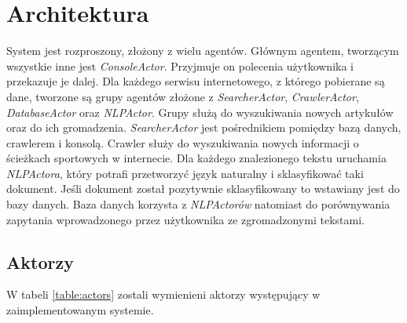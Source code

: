 \documentclass[titlepage]{article}
\begin{document}
\section{Architektura}
System jest rozproszony, złożony z wielu agentów. Głównym agentem, tworzącym wszystkie inne jest \textit{ConsoleActor}. Przyjmuje on polecenia użytkownika i przekazuje je dalej. Dla każdego serwisu internetowego, z którego pobierane są dane, tworzone są grupy agentów złożone z \textit{SearcherActor}, \textit{CrawlerActor}, \textit{DatabaseActor} oraz \textit{NLPActor}. Grupy służą do wyszukiwania nowych artykułów oraz do ich gromadzenia. \textit{SearcherActor} jest pośrednikiem pomiędzy bazą danych, crawlerem i konsolą. Crawler służy do wyszukiwania nowych informacji o ścieżkach sportowych w internecie. Dla każdego znalezionego tekstu uruchamia \textit{NLPActora}, który potrafi przetworzyć język naturalny i sklasyfikować taki dokument. Jeśli dokument został pozytywnie sklasyfikowany to wstawiany jest do bazy danych. Baza danych korzysta z \textit{NLPActorów} natomiast do porównywania zapytania wprowadzonego przez użytkownika ze zgromadzonymi tekstami.

\subsection{Aktorzy}

W tabeli \ref{table:actors} zostali wymienieni aktorzy występujący w zaimplementowanym systemie.
\end{document}
